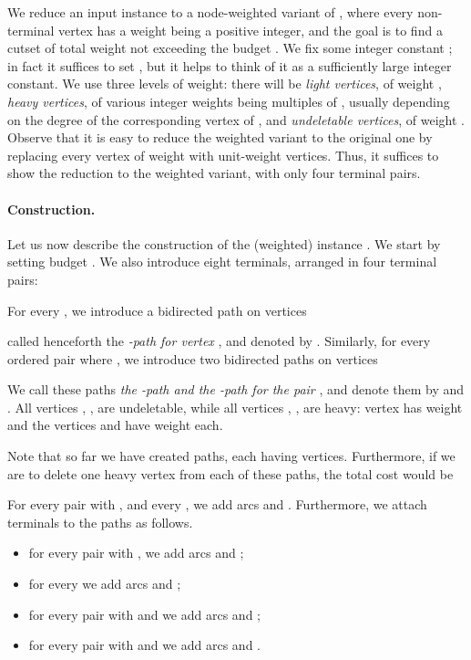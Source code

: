 \newcommand{\sincx}{s_{0 \to n}^{x}}
\newcommand{\tincx}{t_{0 \to n}^{x}}
\newcommand{\sincy}{s_{0 \to n}^{y}}
\newcommand{\tincy}{t_{0 \to n}^{y}}
\newcommand{\sdeclt}{s_{n \to 0}^{<}}
\newcommand{\tdeclt}{t_{n \to 0}^{<}}
\newcommand{\sdecgt}{s_{n \to 0}^{>}}
\newcommand{\tdecgt}{t_{n \to 0}^{>}}

We reduce an input \subiso{} instance 
to a node-weighted variant of \dirmc{}, where every non-terminal vertex has a weight being a positive integer, and the goal is to find a cutset of total weight
not exceeding the budget .
We fix some integer constant ; in fact it suffices to set ,
but it helps to think of it as a sufficiently large integer constant.
 We use three levels of weight: there will be \emph{light vertices}, of weight , \emph{heavy vertices}, of various integer weights being multiples of ,
usually depending on the degree of the corresponding vertex of , and \emph{undeletable vertices}, of weight . Observe that it is easy to reduce the weighted variant to the original one by replacing every vertex of weight  with  unit-weight vertices. Thus, it suffices to show the reduction to the weighted variant, with only four terminal pairs.

\paragraph{Construction.}
Let us now describe the construction of the (weighted)
\dirmc{} instance .
We start by setting budget .
We also introduce eight terminals, arranged in four terminal pairs:

 
For every , we introduce a bidirected path on  vertices

called henceforth the \emph{-path for vertex }, and denoted by .
Similarly, for every ordered pair  where , we introduce two bidirected paths on  vertices

We call these paths \emph{the -path and the -path for the pair }, and denote them by  and .
All vertices , ,  are undeletable, while all vertices , ,  are heavy:
vertex  has weight  and the vertices
 and  have weight  each.

Note that so far we have created  paths, each having  vertices.
Furthermore, if we are to delete one heavy vertex from each of these paths,
the total cost would be


For every pair  with ,
and every , we add arcs  and . Furthermore, we attach terminals to the paths as follows.
\begin{itemize}
\item for every pair  with ,
we add arcs  and ;
\item for every  we add arcs  and ; \item for every pair  with  and  we add arcs  and ;
\item for every pair  with  and 
we add arcs  and .
\end{itemize}

